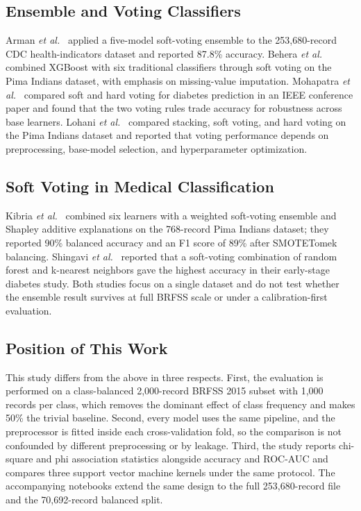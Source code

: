\documentclass[conference]{IEEEtran}
\begin{document}
\subsection{Ensemble and Voting Classifiers}

Arman \textit{et al.}~\cite{arman2025cjms} applied a five-model soft-voting ensemble to the 253,680-record CDC health-indicators dataset and reported 87.8\% accuracy. Behera \textit{et al.}~\cite{behera2021ieee} combined XGBoost with six traditional classifiers through soft voting on the Pima Indians dataset, with emphasis on missing-value imputation. Mohapatra \textit{et al.}~\cite{mohapatra2024voting} compared soft and hard voting for diabetes prediction in an IEEE conference paper and found that the two voting rules trade accuracy for robustness across base learners. Lohani \textit{et al.}~\cite{lohani2025softvoting} compared stacking, soft voting, and hard voting on the Pima Indians dataset and reported that voting performance depends on preprocessing, base-model selection, and hyperparameter optimization.

\subsection{Soft Voting in Medical Classification}

Kibria \textit{et al.}~\cite{kibria2022sensors} combined six learners with a weighted soft-voting ensemble and Shapley additive explanations on the 768-record Pima Indians dataset; they reported 90\% balanced accuracy and an F1 score of 89\% after SMOTETomek balancing. Shingavi \textit{et al.}~\cite{shingavi2024ieee} reported that a soft-voting combination of random forest and k-nearest neighbors gave the highest accuracy in their early-stage diabetes study. Both studies focus on a single dataset and do not test whether the ensemble result survives at full BRFSS scale or under a calibration-first evaluation.

\subsection{Position of This Work}

This study differs from the above in three respects. First, the evaluation is performed on a class-balanced 2,000-record BRFSS 2015 subset with 1,000 records per class, which removes the dominant effect of class frequency and makes 50\% the trivial baseline. Second, every model uses the same pipeline, and the preprocessor is fitted inside each cross-validation fold, so the comparison is not confounded by different preprocessing or by leakage. Third, the study reports chi-square and phi association statistics alongside accuracy and ROC-AUC and compares three support vector machine kernels under the same protocol. The accompanying notebooks extend the same design to the full 253,680-record file and the 70,692-record balanced split.
\end{document}
